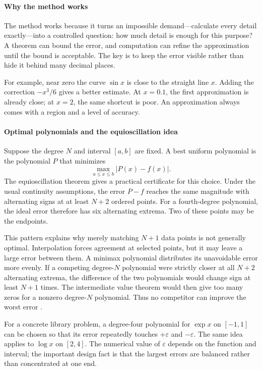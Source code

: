 \paragraph{Why the method works}
The method works because it turns an impossible demand---calculate every detail exactly---into a controlled question: how much detail is enough for this purpose? A theorem can bound the error, and computation can refine the approximation until the bound is acceptable. The key is to keep the error visible rather than hide it behind many decimal places.

For example, near zero the curve $\sin x$ is close to the straight line $x$. Adding the correction $-x^3/6$ gives a better estimate. At $x=0.1$, the first approximation is already close; at $x=2$, the same shortcut is poor. An approximation always comes with a region and a level of accuracy.

\paragraph{Optimal polynomials and the equioscillation idea}

Suppose the degree $N$ and interval $[a,b]$ are fixed. A best uniform polynomial is the polynomial $P$ that minimizes
\[
 \max_{a\leq x\leq b}|P(x)-f(x)|.
\]
The equioscillation theorem gives a practical certificate for this choice. Under the usual continuity assumptions, the error $P-f$ reaches the same magnitude with alternating signs at at least $N+2$ ordered points. For a fourth-degree polynomial, the ideal error therefore has six alternating extrema. Two of these points may be the endpoints.

This pattern explains why merely matching $N+1$ data points is not generally optimal. Interpolation forces agreement at selected points, but it may leave a large error between them. A minimax polynomial distributes its unavoidable error more evenly. If a competing degree-$N$ polynomial were strictly closer at all $N+2$ alternating extrema, the difference of the two polynomials would change sign at least $N+1$ times. The intermediate value theorem would then give too many zeros for a nonzero degree-$N$ polynomial. Thus no competitor can improve the worst error \cite{approximation_theory_ref1,approximation_theory_ref2}.

For a concrete library problem, a degree-four polynomial for $\exp x$ on $[-1,1]$ can be chosen so that its error repeatedly touches $+\varepsilon$ and $-\varepsilon$. The same idea applies to $\log x$ on $[2,4]$. The numerical value of $\varepsilon$ depends on the function and interval; the important design fact is that the largest errors are balanced rather than concentrated at one end.


